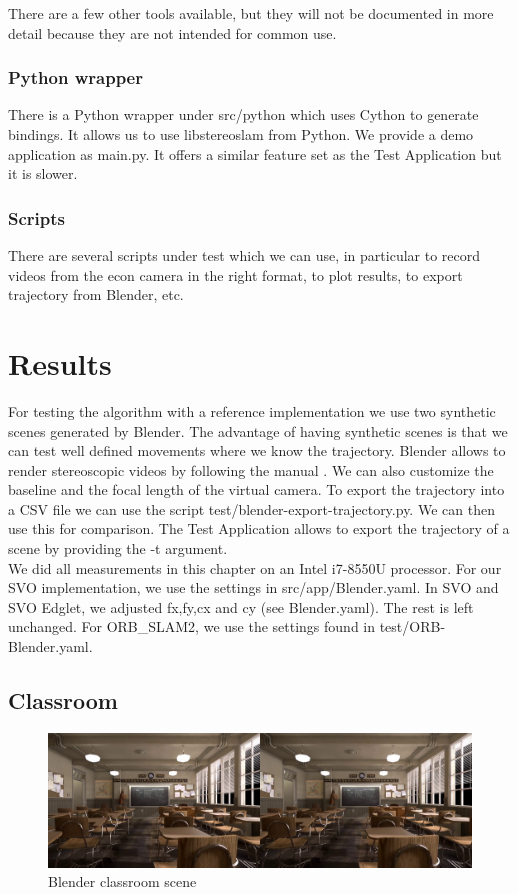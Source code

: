 \documentclass[11pt,a4paper,titlepage,oneside]{report}
\begin{document}
There are a few other tools available, but they will not be documented in more detail because they are not intended for common use.

\subsection{Python wrapper}
There is a Python wrapper under src/python which uses Cython to generate bindings. It allows us to use libstereoslam from Python. We provide a demo application as main.py. It offers a similar feature set as the Test Application but it is slower.

\subsection{Scripts}
There are several scripts under test which we can use, in particular to record videos from the econ camera in the right format, to plot results, to export trajectory from Blender, etc.

\chapter{Results}\label{ch:results}

For testing the algorithm with a reference implementation we use two synthetic scenes generated by Blender. The advantage of having synthetic scenes is that we can test well defined movements where we know the trajectory. Blender allows to render stereoscopic videos by following the manual \cite{blender_stereo}. We can also customize the baseline and the focal length of the virtual camera. To export the trajectory into a CSV file we can use the script test/blender-export-trajectory.py. We can then use this for comparison. The Test Application allows to export the trajectory of a scene by providing the -t argument.\\
We did all measurements in this chapter on an Intel i7-8550U processor. For our SVO implementation, we use the settings in src/app/Blender.yaml. In SVO and SVO Edglet, we adjusted fx,fy,cx and cy (see Blender.yaml). The rest is left unchanged. For ORB\_SLAM2, we use the settings found in test/ORB-Blender.yaml.

\section{Classroom}
\begin{figure}[H]
  \centering
  \includegraphics[width=1.0\textwidth]{img/blender_classroom_scene.png}
  \caption{Blender classroom scene}\label{fig:blender_classroom_scene}
\end{figure}
\end{document}
